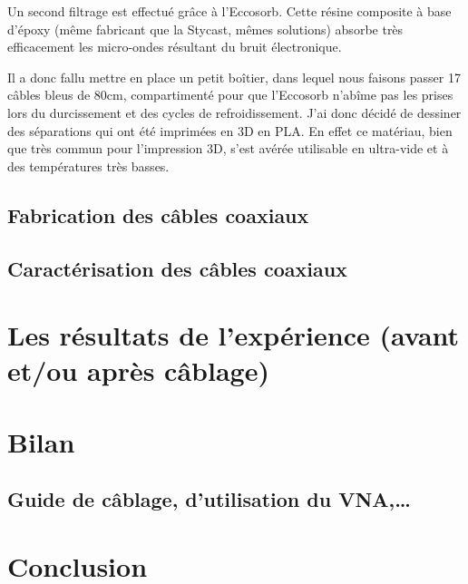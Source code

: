 \documentclass[a4paper,11pt]{report}
\begin{document}
Un second filtrage est effectué grâce à l'Eccosorb. Cette résine composite à base d'époxy (même fabricant que la Stycast, mêmes solutions) absorbe très efficacement les micro-ondes résultant du bruit électronique.

Il a donc fallu mettre en place un petit boîtier, dans lequel nous faisons passer 17 câbles bleus de 80cm, compartimenté pour que l'Eccosorb n'abîme pas les prises lors du durcissement et des cycles de refroidissement. J'ai donc décidé de dessiner des séparations qui ont été imprimées en 3D en PLA. En effet ce matériau, bien que très commun pour l'impression 3D, s'est avérée utilisable en ultra-vide et à des températures très basses.



\section{Fabrication des câbles coaxiaux}

\section{Caractérisation des câbles coaxiaux}


\chapter{Les résultats de l'expérience (avant et/ou après câblage)}

\chapter{Bilan}
\section{Guide de câblage, d'utilisation du VNA,…}
\chapter*{Conclusion}
%



\end{document}
